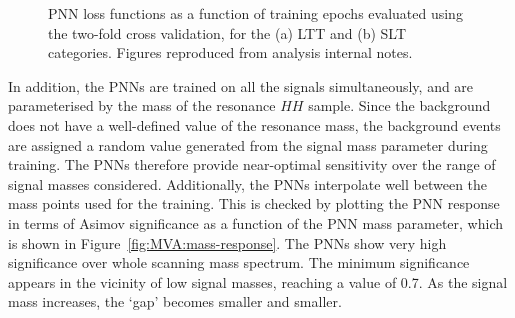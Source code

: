 \begin{figure}
  \centering
  \quad
  \quad
  \caption{PNN loss functions as a function of training epochs evaluated 
  using the two-fold cross validation, for the (a) LTT and (b) SLT categories.
  Figures reproduced from analysis internal notes. }
  \label{fig:overtrainingtestpnn}
\end{figure}



In addition, the PNNs are trained on all the signals simultaneously, 
and are parameterised by the mass of the resonance $HH$ sample. 
Since the background does not have a well-defined value of the
resonance mass, the background events are assigned a random value
generated from the signal mass parameter during training. 
The PNNs therefore provide near-optimal sensitivity over the
range of signal masses considered. 
Additionally, the PNNs interpolate well between the mass points used for the training.
This is checked by plotting the PNN response in terms of Asimov significance
as a function of the PNN mass parameter, which is shown in Figure~\ref{fig:MVA:mass-response}. 
The PNNs show very high significance over whole scanning mass spectrum. 
The minimum significance appears in the vicinity of low signal masses, reaching a 
value of 0.7. As the signal mass increases, the `gap' becomes smaller and smaller.



